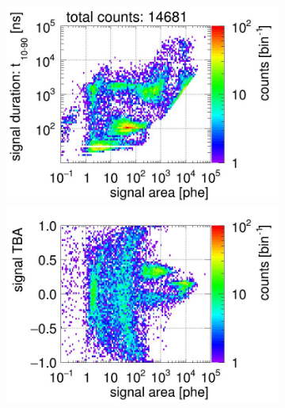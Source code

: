 \begin{landscape}
	
\begin{figure}[!p]
	\centering
	\begin{subfigure}[t]{0.32\textwidth} %
		\centering
		\includegraphics[width=\figurewidth,clip,trim={0 98 0 15}]{Figures/GasTest/CutsValid/res64767/pdpa03Vecfig64767.jpg}
		\includegraphics[width=\figurewidth,clip,trim={0 8 0 40}]{Figures/GasTest/CutsValid/res64767/tbapa03Vecfig64767.jpg}
		\caption{}
		\label{fig:signal selection 03}
	\end{subfigure}
	\begin{subfigure}[t]{0.32\textwidth}

\end{subfigure}
\end{figure}
\end{landscape}
